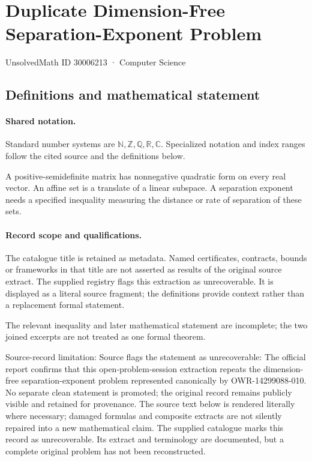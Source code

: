 \documentclass[11pt]{article}
\begin{document}
\setcounter{section}{30006212}
\section{Duplicate Dimension-Free Separation-Exponent Problem}\label{30006213}
{\small\sffamily UnsolvedMath ID 30006213 · Computer Science}
\subsection{Definitions and mathematical statement}

\paragraph{Shared notation.}Standard number systems are $\mathbb N,\mathbb Z,\mathbb Q,\mathbb R,\mathbb C$. Specialized notation and index ranges follow the cited source and the definitions below.


A positive-semidefinite matrix has nonnegative quadratic form on every real vector. An affine set is a translate of a linear subspace. A separation exponent needs a specified inequality measuring the distance or rate of separation of these sets.
\paragraph{Record scope and qualifications.}
The catalogue title is retained as metadata. Named certificates, contracts, bounds or frameworks in that title are not asserted as results of the original source extract.
The supplied registry flags this extraction as unrecoverable. It is displayed as a literal source fragment; the definitions provide context rather than a replacement formal statement.

The relevant inequality and later mathematical statement are incomplete; the two joined excerpts are not treated as one formal theorem.

Source-record limitation: Source flags the statement as unrecoverable: The official report confirms that this open-problem-session extraction repeats the dimension-free separation-exponent problem represented canonically by OWR-14299088-010. No separate clean statement is promoted; the original record remains publicly visible and retained for provenance.
The source text below is rendered literally where necessary; damaged formulas and composite extracts are not silently repaired into a new mathematical claim.
The supplied catalogue marks this record as unrecoverable. Its extract and terminology are documented, but a complete original problem has not been reconstructed.
\end{document}
